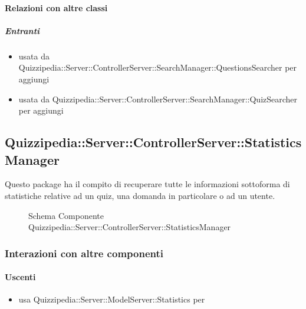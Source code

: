 \paragraph{Relazioni con altre classi}
\subparagraph{Entranti}
\begin{itemize}
\item usata da Quizzipedia::Server::ControllerServer::SearchManager::QuestionsSearcher per aggiungi
\item usata da Quizzipedia::Server::ControllerServer::SearchManager::QuizSearcher per aggiungi
\end{itemize}
\subsection{Quizzipedia::Server::ControllerServer::StatisticsManager}
Questo package ha il compito di recuperare tutte le informazioni sottoforma di statistiche relative ad un quiz, una domanda in particolare o ad un utente.
\begin{figure}[H]
\centering
\noindent{}
\caption[Schema Componente Quizzipedia::Server::ControllerServer::StatisticsManager]{Schema Componente Quizzipedia::Server::ControllerServer::StatisticsManager}
\end{figure}
\subsubsection{Interazioni con altre componenti}
\paragraph{Uscenti}
\begin{itemize}
\item usa Quizzipedia::Server::ModelServer::Statistics per 
\end{itemize}
